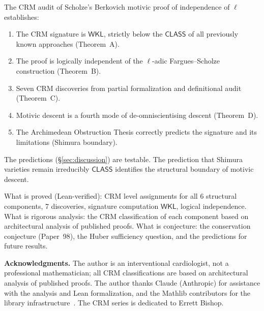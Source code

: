 \documentclass[11pt,a4paper]{article}
\theoremstyle{plain}
\theoremstyle{definition}
\newcommand{\WKL}{\textsf{WKL}}
\newcommand{\CLASS}{\textsf{CLASS}}
\begin{document}
The CRM audit of Scholze's Berkovich motivic proof of independence of $\ell$ establishes:

\begin{enumerate}[label=(\arabic*)]
\item The CRM signature is $\WKL$, strictly below the $\CLASS$ of all previously known approaches (Theorem~A).
\item The proof is logically independent of the $\ell$-adic Fargues--Scholze construction (Theorem~B).
\item Seven CRM discoveries from partial formalization and definitional audit (Theorem~C).
\item Motivic descent is a fourth mode of de-omniscientising descent (Theorem~D).
\item The Archimedean Obstruction Thesis correctly predicts the signature and its limitations (Shimura boundary).
\end{enumerate}

The predictions (\S\ref{sec:discussion}) are testable. The prediction that Shimura varieties remain irreducibly $\CLASS$ identifies the structural boundary of motivic descent.

What is proved (Lean-verified): CRM level assignments for all 6 structural components, 7 discoveries, signature computation $\WKL$, logical independence. What is rigorous analysis: the CRM classification of each component based on architectural analysis of published proofs. What is conjecture: the conservation conjecture (Paper~98), the Huber sufficiency question, and the predictions for future results.

\bigskip
\noindent\textbf{Acknowledgments.} The author is an interventional cardiologist, not a professional mathematician; all CRM classifications are based on architectural analysis of published proofs. The author thanks Claude (Anthropic) for assistance with the analysis and Lean formalization, and the Mathlib contributors for the library infrastructure~\cite{mathlib4}. The CRM series is dedicated to Errett Bishop.
\end{document}
